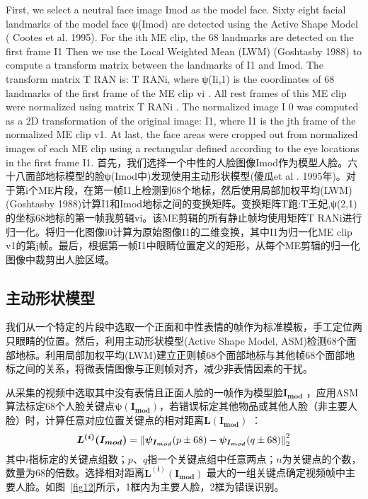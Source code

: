 First, we select a neutral face image Imod as the model face. Sixty eight facial landmarks of the model face ψ(Imod) are detected using the Active Shape Model ( Cootes et al. 1995). For the ith ME clip, the 68 landmarks are detected on the first frame I1 Then we use the Local Weighted Mean (LWM) (Goshtasby 1988) to compute a transform matrix between the landmarks of I1 and Imod. The transform matrix T RAN is: T RANi, where ψ(Ii,1) is the coordinates of 68 landmarks of the first frame of the ME clip vi . All rest frames of this ME clip were normalized using matrix T RANi . The normalized image I 0 was computed as a 2D transformation of the original image: I1, where I1 is the jth frame of the normalized ME clip v1. At last, the face areas were cropped out from normalized images of each ME clip using a rectangular defined according to the eye locations in the first frame I1.
首先，我们选择一个中性的人脸图像Imod作为模型人脸。六十八面部地标模型的脸ψ(Imod中)发现使用主动形状模型(傻瓜et al . 1995年)。对于第i个ME片段，在第一帧I1上检测到68个地标，然后使用局部加权平均(LWM) (Goshtasby 1988)计算I1和Imod地标之间的变换矩阵。变换矩阵T跑:T王妃,ψ(2,1)的坐标68地标的第一帧我剪辑vi。该ME剪辑的所有静止帧均使用矩阵T RANi进行归一化。将归一化图像i0计算为原始图像I1的二维变换，其中I1为归一化ME clip v1的第j帧。最后，根据第一帧I1中眼睛位置定义的矩形，从每个ME剪辑的归一化图像中裁剪出人脸区域。

\subsection{主动形状模型}

我们从一个特定的片段中选取一个正面和中性表情的帧作为标准模板，手工定位两只眼睛的位置。然后，利用主动形状模型(Active Shape Model, ASM)检测68个面部地标\citep{cootes1995active}。利用局部加权平均(LWM)建立正则帧68个面部地标与其他帧68个面部地标之间的关系，将微表情图像与正则帧对齐，减少非表情因素的干扰\citep{goshtasby1988image}。

从采集的视频中选取其中没有表情且正面人脸的一帧作为模型脸$\boldsymbol{I_{mod}}$ ，应用ASM算法标定68个人脸关键点$\boldsymbol{\psi(I_{mod})}$，若错误标定其他物品或其他人脸（非主要人脸）时，计算任意对应位置关键点的相对距离$\boldsymbol{L(I_{mod})}$ ：
\begin{equation}
    \label{eq2}
    \boldsymbol{L^{(i)}(I_{mod})}=\left \| \boldsymbol{\psi_{I_{mod}}}(p\pm 68)-\boldsymbol{\psi_{I_{mod}}}(q\pm 68) \right \|_{2}^{2\displaystyle }
\end{equation}
其中$i$指标定的关键点组数；$p$、$q$指一个关键点组中任意两点；$n$为关键点的个数，数量为68的倍数。选择相对距离$\boldsymbol{L^{(i)}(I_{mod})}$ 最大的一组关键点确定视频帧中主要人脸。如图~\ref{fig12}所示，1框内为主要人脸，2框为错误识别。

